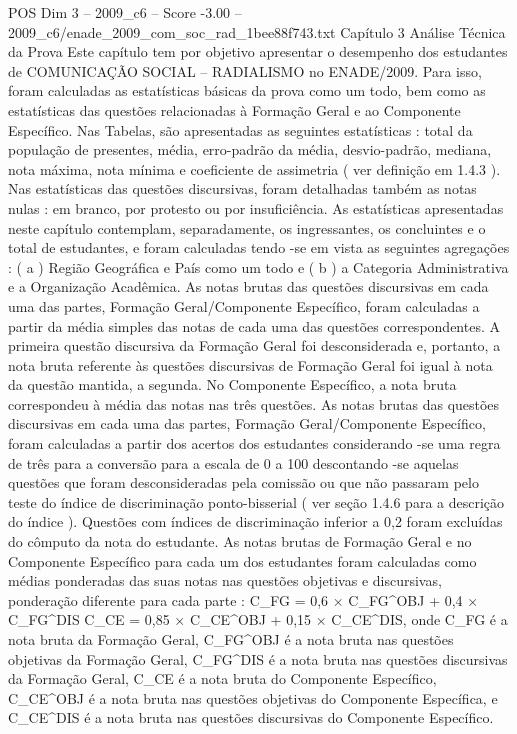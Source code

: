\begin{textsample}{POS Dim 3 – 2009\_c6 – Score -3.00 – 2009\_c6/enade\_2009\_com\_soc\_rad\_1bee88f743.txt}  \label{ex:f3_pos_245}
Capítulo 3 Análise Técnica da Prova Este capítulo tem por objetivo apresentar o desempenho dos estudantes de COMUNICAÇÃO SOCIAL – RADIALISMO no ENADE/2009.
Para isso, foram calculadas as estatísticas básicas da prova como um todo, bem como as estatísticas das questões relacionadas à Formação Geral e ao Componente Específico.
Nas Tabelas, são apresentadas as seguintes estatísticas : total da população de presentes, média, erro-padrão da média, desvio-padrão, mediana, nota máxima, nota mínima e coeficiente de assimetria ( ver definição em 1.4.3 ).
Nas estatísticas das questões discursivas, foram detalhadas também as notas nulas : em branco, por protesto ou por insuficiência.
As estatísticas apresentadas neste capítulo contemplam, separadamente, os ingressantes, os concluintes e o total de estudantes, e foram calculadas tendo -se em vista as seguintes agregações : ( a ) Região Geográfica e País como um todo e ( b ) a Categoria Administrativa e a Organização Acadêmica.
As notas brutas das questões discursivas em cada uma das partes, Formação Geral/Componente Específico, foram calculadas a partir da média simples das notas de cada uma das questões correspondentes.
A primeira questão discursiva da Formação Geral foi desconsiderada e, portanto, a nota bruta referente às questões discursivas de Formação Geral foi igual à nota da questão mantida, a segunda.
No Componente Específico, a nota bruta correspondeu à média das notas nas três questões.
As notas brutas das questões discursivas em cada uma das partes, Formação Geral/Componente Específico, foram calculadas a partir dos acertos dos estudantes considerando -se uma regra de três para a conversão para a escala de 0 a 100 descontando -se aquelas questões que foram desconsideradas pela comissão ou que não passaram pelo teste do índice de discriminação ponto-bisserial ( ver seção 1.4.6 para a descrição do índice ).
Questões com índices de discriminação inferior a 0,2 foram excluídas do cômputo da nota do estudante.
As notas brutas de Formação Geral e no Componente Específico para cada um dos estudantes foram calculadas como médias ponderadas das suas notas nas questões objetivas e discursivas, ponderação diferente para cada parte : C\_FG = 0,6 × C\_FG\textasciicircum{}OBJ + 0,4 × C\_FG\textasciicircum{}DIS C\_CE = 0,85 × C\_CE\textasciicircum{}OBJ + 0,15 × C\_CE\textasciicircum{}DIS, onde C\_FG é a nota bruta da Formação Geral, C\_FG\textasciicircum{}OBJ é a nota bruta nas questões objetivas da Formação Geral, C\_FG\textasciicircum{}DIS é a nota bruta nas questões discursivas da Formação Geral, C\_CE é a nota bruta do Componente Específico, C\_CE\textasciicircum{}OBJ é a nota bruta nas questões objetivas do Componente Específica, e C\_CE\textasciicircum{}DIS é a nota bruta nas questões discursivas do Componente Específico.

\end{textsample}
